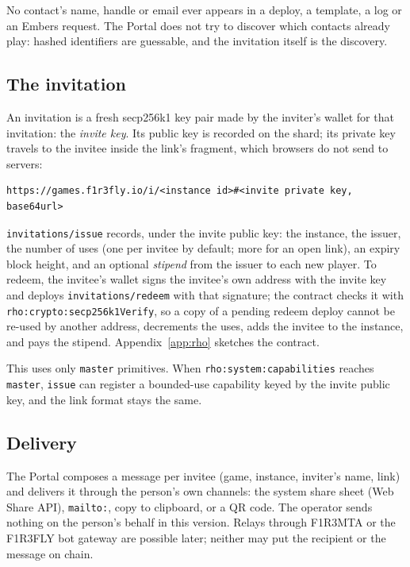 \documentclass[11pt]{article}
\theoremstyle{definition}
\theoremstyle{remark}
\newcommand{\code}[1]{\texttt{#1}}
\newcommand{\Em}{Embers}
\begin{document}
No contact's name, handle or email ever appears in a deploy, a template, a log or an
\Em{} request. The Portal does not try to discover which contacts already play:
hashed identifiers are guessable, and the invitation itself is the discovery.

\subsection{The invitation}

An invitation is a fresh secp256k1 key pair made by the inviter's wallet for that
invitation: the \emph{invite key}. Its public key is recorded on the shard; its
private key travels to the invitee inside the link's fragment, which browsers do not
send to servers:

\begin{lstlisting}
https://games.f1r3fly.io/i/<instance id>#<invite private key, base64url>
\end{lstlisting}

\code{invitations/issue} records, under the invite public key: the instance, the
issuer, the number of uses (one per invitee by default; more for an open link), an
expiry block height, and an optional \emph{stipend} from the issuer to each new
player. To redeem, the invitee's wallet signs the invitee's own address with the
invite key and deploys \code{invitations/redeem} with that signature; the contract
checks it with \code{rho:crypto:secp256k1Verify}, so a copy of a pending redeem deploy
cannot be re-used by another address, decrements the uses, adds the invitee to the
instance, and pays the stipend. Appendix~\ref{app:rho} sketches the contract.

This uses only \code{master} primitives. When \code{rho:system:capabilities} reaches
\code{master}, \code{issue} can register a bounded-use capability keyed by the invite
public key, and the link format stays the same.

\subsection{Delivery}\label{sec:delivery}

The Portal composes a message per invitee (game, instance, inviter's name, link) and
delivers it through the person's own channels: the system share sheet (Web Share
API), \code{mailto:}, copy to clipboard, or a QR code. The operator sends nothing on
the person's behalf in this version. Relays through F1R3MTA or the F1R3FLY bot
gateway are possible later; neither may put the recipient or the message on chain.
\end{document}
